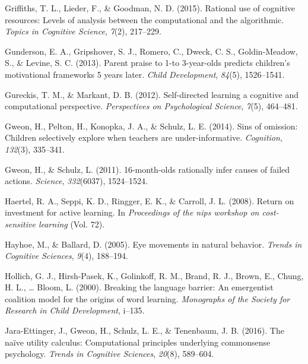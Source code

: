 \documentclass[oneside]{report}
\begin{document}
\leavevmode\hypertarget{ref-griffiths2015rational}{}%
Griffiths, T. L., Lieder, F., \& Goodman, N. D. (2015). Rational use of
cognitive resources: Levels of analysis between the computational and
the algorithmic. \emph{Topics in Cognitive Science}, \emph{7}(2),
217--229.

\leavevmode\hypertarget{ref-gunderson2013parent}{}%
Gunderson, E. A., Gripshover, S. J., Romero, C., Dweck, C. S.,
Goldin-Meadow, S., \& Levine, S. C. (2013). Parent praise to 1-to
3-year-olds predicts children's motivational frameworks 5 years later.
\emph{Child Development}, \emph{84}(5), 1526--1541.

\leavevmode\hypertarget{ref-gureckis2012self}{}%
Gureckis, T. M., \& Markant, D. B. (2012). Self-directed learning a
cognitive and computational perspective. \emph{Perspectives on
Psychological Science}, \emph{7}(5), 464--481.

\leavevmode\hypertarget{ref-gweon2014sins}{}%
Gweon, H., Pelton, H., Konopka, J. A., \& Schulz, L. E. (2014). Sins of
omission: Children selectively explore when teachers are
under-informative. \emph{Cognition}, \emph{132}(3), 335--341.

\leavevmode\hypertarget{ref-gweon201116}{}%
Gweon, H., \& Schulz, L. (2011). 16-month-olds rationally infer causes
of failed actions. \emph{Science}, \emph{332}(6037), 1524--1524.

\leavevmode\hypertarget{ref-haertel2008return}{}%
Haertel, R. A., Seppi, K. D., Ringger, E. K., \& Carroll, J. L. (2008).
Return on investment for active learning. In \emph{Proceedings of the
nips workshop on cost-sensitive learning} (Vol. 72).

\leavevmode\hypertarget{ref-hayhoe2005eye}{}%
Hayhoe, M., \& Ballard, D. (2005). Eye movements in natural behavior.
\emph{Trends in Cognitive Sciences}, \emph{9}(4), 188--194.

\leavevmode\hypertarget{ref-hollich2000breaking}{}%
Hollich, G. J., Hirsh-Pasek, K., Golinkoff, R. M., Brand, R. J., Brown,
E., Chung, H. L., \ldots{} Bloom, L. (2000). Breaking the language
barrier: An emergentist coalition model for the origins of word
learning. \emph{Monographs of the Society for Research in Child
Development}, i--135.

\leavevmode\hypertarget{ref-jara2016naive}{}%
Jara-Ettinger, J., Gweon, H., Schulz, L. E., \& Tenenbaum, J. B. (2016).
The naïve utility calculus: Computational principles underlying
commonsense psychology. \emph{Trends in Cognitive Sciences},
\emph{20}(8), 589--604.
\end{document}
